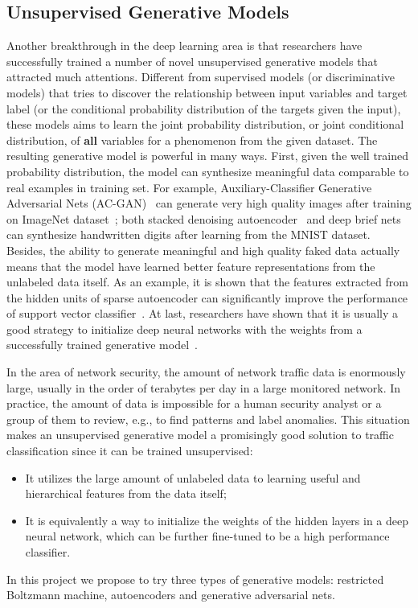 \subsection{Unsupervised Generative Models}
Another breakthrough in the deep learning area is that researchers have successfully trained
a number of novel unsupervised generative models that attracted much attentions.
Different from supervised models (or discriminative models) that tries to discover the relationship between input variables and target label (or the conditional probability distribution of the targets given the input),
these models aims to learn the joint probability distribution, or joint conditional distribution,
of \textbf{all} variables for a phenomenon from the given dataset.
The resulting generative model is powerful in many ways.
First, given the well trained probability distribution, the model can synthesize meaningful data
comparable to real examples in training set.
For example, Auxiliary-Classifier Generative Adversarial Nets (AC-GAN)~\cite{AC-GAN} can generate very high quality
images after training on ImageNet dataset~\cite{ImageNet};
both stacked denoising autoencoder~\cite{DenoiseAE} and deep brief nets~\cite{DeepBeliefNets} can synthesize
handwritten digits after learning from the MNIST dataset.
Besides, the ability to generate meaningful and high quality faked data actually means that
the model have learned better feature representations from the unlabeled data itself.
As an example, it is shown that the features extracted from the hidden units of sparse autoencoder
can significantly improve the performance of support vector classifier~\cite{SparseAE}.
At last, researchers have shown that it is usually a good strategy to initialize deep neural networks
with the weights from a successfully trained generative model~\cite{DeepBeliefNets, Momentum}.

In the area of network security, the amount of network traffic data is enormously large,
usually in the order of terabytes per day in a large monitored network.
In practice, the amount of data is impossible for a human security analyst or
a group of them to review, e.g., to find patterns and label anomalies.
This situation makes an unsupervised generative model a promisingly good solution
to traffic classification since it can be trained unsupervised:
\begin{itemize}
    \item It utilizes the large amount of unlabeled data to learning useful and hierarchical features
        from the data itself;
    \item It is equivalently a way to initialize the weights of the hidden layers
        in a deep neural network, which can be further fine-tuned to be a high performance classifier.
\end{itemize}
In this project we propose to try three types of generative models:
restricted Boltzmann machine, autoencoders and generative adversarial nets.

